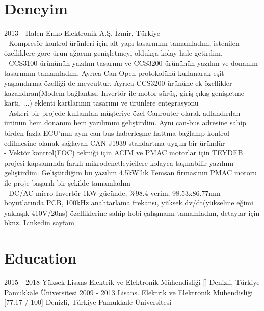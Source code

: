 \documentclass[]{cv-style} %
\begin{document}
\section{Deneyim}
\begin{entrylist}
\entry
  {2013 - Halen}
  {Enko Elektronik A.Ş.}
  {İzmir, Türkiye}
  {\\
- Kompresör kontrol ürünleri için alt yapı tasarımını tamamladım, istenilen özelliklere göre ürün ağacını genişletmeyi oldukça kolay hale getirdim. 
\\- CCS3100 ürününün yazılım tasarımı ve CCS3200 ürününün yazılım ve donanım tasarımını tamamladım. Ayrıca Can-Open protokolünü kullanarak eşit yaşlandırma özelliği de mevcuttur. Ayrıca CCS3200 ürününe ek özellikler kazandıran(Modem bağlantısı, Invertör ile motor sürüş, giriş-çıkış genişletme kartı, ...) eklenti kartlarının tasarımı ve ürünlere entegrasyonu
\\- Askeri bir projede kullanılan müşteriye özel Canrouter olarak adlandırılan ürünün hem donanım hem yazılımını geliştirdim. Aynı can-bus adresine sahip birden fazla ECU'nun aynı can-bus haberleşme hattına bağlanıp kontrol edilmesine olanak sağlayan CAN-J1939 standartına uygun bir üründür
\\- Vektör kontrol(FOC) tekniği için ACIM ve PMAC motorlar için TEYDEB projesi kapsamında farklı mikrodenetleyicilere kolayca taşınabilir yazılımı geliştirdim. Geliştirdiğim bu yazılım 4.5kW'lık Femsan firmasının PMAC motoru ile proje başarılı bir şekilde tamamladım
\\- DC/AC micro-İnvertör 1kW gücünde, $\%$98.4 verim, 98.53x86.77mm boyutlarında PCB, 100kHz anahtarlama frekansı, yüksek dv/dt(yükselme eğimi yaklaşık 410V/20ns) özelliklerine sahip hobi çalışmamı tamamladım, detaylar için bknz. Linkedin sayfam}
\end{entrylist}
\section{Education}
\begin{entrylist}
\entry
{2015 - 2018}
{Yüksek Lisans {\normalfont Elektrik ve Elektronik Mühendisliği []}}
{Denizli, Türkiye}
{Pamukkale Üniversitesi}
\entry
{2009 - 2013}
{Lisans. {\normalfont Elektrik ve Elektronik Mühendisliği [77.17 / 100]}}
{Denizli, Türkiye}
{Pamukkale Üniversitesi}
\end{entrylist} 
\end{document}
